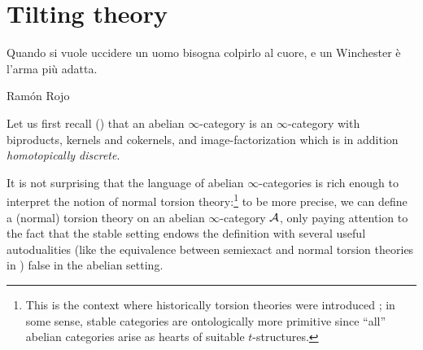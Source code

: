\section{Tilting theory}
\epigraph{Quando si vuole uccidere un uomo bisogna colpirlo al cuore, e un Winchester è l'arma più adatta.}{Ramón Rojo}
Let us first recall (\adef {}) that an abelian $\infty$\hyp{}category is an $\infty$\hyp{}category with biproducts, kernels and cokernels, and image\hyp{}factorization which is in addition \emph{homotopically discrete}.

It is not surprising that the language of abelian $\infty$\hyp{}categories is rich enough to interpret the notion of normal torsion theory:\footnote{This is the context where historically torsion theories were introduced \cite{dickson1966torsion}; in some sense, stable categories are ontologically more primitive since ``all'' abelian categories arise as hearts of suitable $t$\hyp{}structures.} to be more precise, we can define a (normal) torsion theory on an abelian $\infty$\hyp{}category $\mathcal{A}$, only paying attention to the fact that the stable setting endows the definition with several useful autodualities (like the equivalence between semiexact and normal torsion theories in \cite{FL0}) false in the abelian setting.

